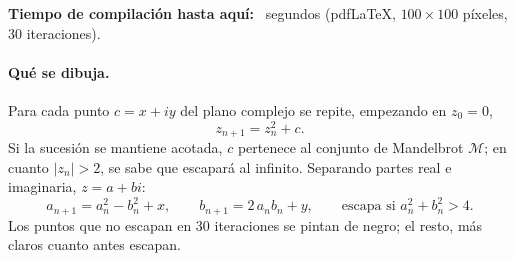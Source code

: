 \documentclass[a4paper]{article}
\def\resolucion{100}   %
\def\iteraciones{30}  %
\begin{document}
\ifdefined\pdfelapsedtime
\bigskip
\noindent\textbf{Tiempo de compilación hasta aquí:}
~segundos
(pdf\LaTeX{}, \(\resolucion \times \resolucion\) píxeles, \iteraciones{} iteraciones).
\fi

\paragraph{Qué se dibuja.} Para cada punto \(c = x + iy\) del plano complejo se
repite, empezando en \(z_0 = 0\),
\[
  z_{n+1} = z_n^2 + c .
\]
Si la sucesión se mantiene acotada, \(c\) pertenece al conjunto de Mandelbrot
\(\mathcal{M}\); en cuanto \(\lvert z_n\rvert > 2\), se sabe que escapará al
infinito. Separando partes real e imaginaria, \(z = a + bi\):
\[
  a_{n+1} = a_n^2 - b_n^2 + x, \qquad
  b_{n+1} = 2\,a_n b_n + y, \qquad
  \text{escapa si } a_n^2 + b_n^2 > 4 .
\]
Los puntos que no escapan en \iteraciones{} iteraciones se pintan de negro; el
resto, más claros cuanto antes escapan.
\end{document}

